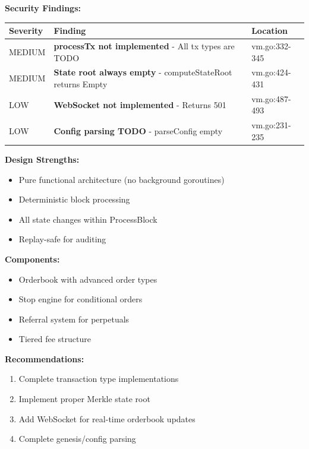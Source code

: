\documentclass[
]{article}
\newcounter{none} %
\providecommand{\tightlist}{%
  \setlength{\itemsep}{0pt}\setlength{\parskip}{0pt}}
\begin{document}
\textbf{Security Findings:}

{\def\LTcaptype{none} %
\begin{longtable}[]{@{}lll@{}}
\toprule\noalign{}
Severity & Finding & Location \\
\midrule\noalign{}
\endhead
\bottomrule\noalign{}
\endlastfoot
MEDIUM & \textbf{processTx not implemented} - All tx types are TODO &
vm.go:332-345 \\
MEDIUM & \textbf{State root always empty} - computeStateRoot returns
Empty & vm.go:424-431 \\
LOW & \textbf{WebSocket not implemented} - Returns 501 &
vm.go:487-493 \\
LOW & \textbf{Config parsing TODO} - parseConfig empty &
vm.go:231-235 \\
\end{longtable}
}

\textbf{Design Strengths:}

\begin{itemize}
\tightlist
\item
  Pure functional architecture (no background goroutines)
\item
  Deterministic block processing
\item
  All state changes within ProcessBlock
\item
  Replay-safe for auditing
\end{itemize}

\textbf{Components:}

\begin{itemize}
\tightlist
\item
  Orderbook with advanced order types
\item
  Stop engine for conditional orders
\item
  Referral system for perpetuals
\item
  Tiered fee structure
\end{itemize}

\textbf{Recommendations:}

\begin{enumerate}
\def\labelenumi{\arabic{enumi}.}
\tightlist
\item
  Complete transaction type implementations
\item
  Implement proper Merkle state root
\item
  Add WebSocket for real-time orderbook updates
\item
  Complete genesis/config parsing
\end{enumerate}
\end{document}
